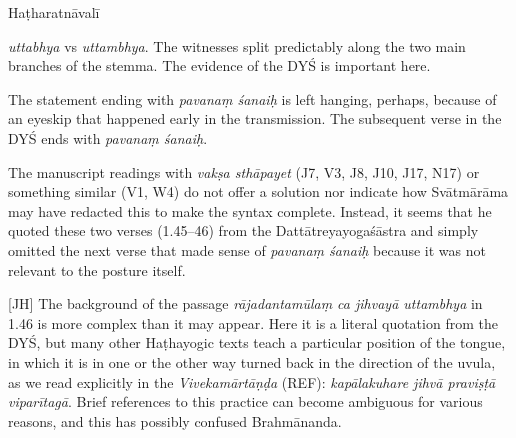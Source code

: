 \begin{ekdosis}
\begin{testimonia}[hp01_045]
Haṭharatnāvalī

\begin{versinnote}
\end{versinnote}

\end{testimonia}

\begin{philcomm}[hp01_045]
\emph{uttabhya} vs \emph{uttambhya}.
The witnesses split predictably along the two main branches of the stemma. The evidence of the DYŚ is important here.

The statement ending with \emph{pavanaṃ śanaiḥ} is left hanging, perhaps, because of an eyeskip that happened early in the transmission. The subsequent verse in the DYŚ ends with \emph{pavanaṃ śanaiḥ}.


\begin{versinnote}
\end{versinnote}

The manuscript readings with \emph{vakṣa sthāpayet} (J7, V3, J8, J10, J17, N17) or something similar (V1, W4) do not offer a solution nor indicate how Svātmārāma may have redacted this to make the syntax complete. Instead, it seems that he quoted these two verses (1.45–46) from the Dattātreyayogaśāstra and simply omitted the next verse that made sense of \emph{pavanaṃ śanaiḥ} because it was not relevant to the posture itself.

[JH] The background of the passage \emph{rājadantamūlaṃ ca jihvayā uttambhya} in 1.46 is more complex
than it may appear. Here it is a literal quotation from the DYŚ, but many other Haṭhayogic texts
teach a particular position of the tongue, in which it is in one or the other way turned back in
the direction of the uvula, as we read explicitly in the \emph{Vivekamārtāṇḍa} (REF):
\emph{kapālakuhare jihvā praviṣṭā viparītagā}. Brief references to this practice can become
ambiguous for various reasons, and this has possibly confused Brahmānanda.


\end{philcomm}
\end{ekdosis}
